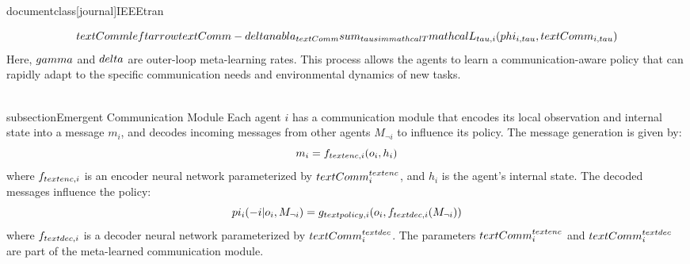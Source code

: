 \\documentclass[journal]{IEEEtran}
\begin{document}
$$ \\text{Comm} \\leftarrow \\text{Comm} - \\delta \\nabla_{\\text{Comm}} \\sum_{\\tau \\sim \\mathcal{T}} \\mathcal{L}_{\\tau,i}(\\phi_{i,\\tau}, \\text{Comm}_{i,\\tau}) $$
Here, $\\gamma$ and $\\delta$ are outer-loop meta-learning rates. This process allows the agents to learn a communication-aware policy that can rapidly adapt to the specific communication needs and environmental dynamics of new tasks.

\\subsection{Emergent Communication Module}
Each agent $i$ has a communication module that encodes its local observation and internal state into a message $m_i$, and decodes incoming messages from other agents $M_{\neg i}$ to influence its policy.
The message generation is given by:
$$ m_i = f_{\\text{enc},i}(o_i, h_i) $$
where $f_{\\text{enc},i}$ is an encoder neural network parameterized by $\\text{Comm}_i^{\\text{enc}}$, and $h_i$ is the agent's internal state.
The decoded messages influence the policy:
$$ \\pi_i(-i | o_i, M_{\neg i}) = g_{\\text{policy},i}(o_i, f_{\\text{dec},i}(M_{\neg i})) $$
where $f_{\\text{dec},i}$ is a decoder neural network parameterized by $\\text{Comm}_i^{\\text{dec}}$. The parameters $\\text{Comm}_i^{\\text{enc}}$ and $\\text{Comm}_i^{\\text{dec}}$ are part of the meta-learned communication module.
\end{document}
